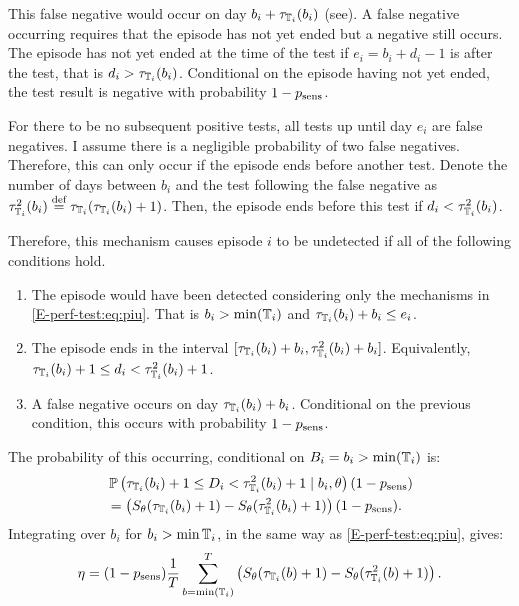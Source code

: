 \documentclass[thesis.tex]{subfiles}
\begin{document}
This false negative would occur on day $b_i + \tau_{\mathbb{T}_i}(b_i)$ (see).
A false negative occurring requires that the episode has not yet ended but a negative still occurs.
The episode has not yet ended at the time of the test if $e_i = b_i + d_i - 1$ is after the test, that is $d_i > \tau_{\mathbb{T}_i}(b_i)$.
Conditional on the episode having not yet ended, the test result is negative with probability $1 - p_\text{sens}$.

For there to be no subsequent positive tests, all tests up until day $e_i$ are false negatives.
I assume there is a negligible probability of two false negatives.
Therefore, this can only occur if the episode ends before another test.
Denote the number of days between $b_i$ and the test following the false negative as $\tau^2_{\mathbb{T}_i}(b_i) \stackrel{\text{def}}{=} \tau_{\mathbb{T}_i}(\tau_{\mathbb{T}_i}(b_i) + 1)$.
Then, the episode ends before this test if $d_i < \tau^2_{\mathbb{T}_i}(b_i)$.

Therefore, this mechanism causes episode $i$ to be undetected if all of the following conditions hold.
\begin{enumerate}
    \item The episode would have been detected considering only the mechanisms in \cref{E-perf-test:eq:piu}. That is $b_i > \min(\mathbb{T}_i)$ and $\tau_{\mathbb{T}_i}(b_i) + b_i \leq e_i$.
    \item The episode ends in the interval $[\tau_{\mathbb{T}_i}(b_i) + b_i, \tau^2_{\mathbb{T}_i}(b_i) + b_i]$. Equivalently, $\tau_{\mathbb{T}_i}(b_i) + 1 \leq d_i < \tau^2_{\mathbb{T}_i}(b_i) + 1$.
    \item A false negative occurs on day $\tau_{\mathbb{T}_i}(b_i) + b_i$. Conditional on the previous condition, this occurs with probability $1 - p_\text{sens}$.
\end{enumerate}

The probability of this occurring, conditional on $B_i = b_i > \min(\mathbb{T}_i)$ is:
\begin{align}
&\operatorname{\mathbb{P}} \left(
    \tau_{\mathbb{T}_i}(b_i) + 1 \leq D_i < \tau^2_{\mathbb{T}_i}(b_i) + 1
    \mid b_i,
\theta \right) (1 - p_\text{sens}) \\
&= \left( S_\theta(\tau_{\mathbb{T}_i}(b_i) + 1) - S_\theta(\tau^2_{\mathbb{T}_i}(b_i) + 1) \right) (1 - p_\text{sens}).
\end{align}
Integrating over $b_i$ for $b_i > \min \mathbb{T}_i$, in the same way as \cref{E-perf-test:eq:piu}, gives:
\begin{align}
\eta = (1 - p_\text{sens})\frac{1}{T} \sum_{b=\min(\mathbb{T}_i)}^T \left( S_\theta(\tau_{\mathbb{T}_i}(b) + 1) - S_\theta(\tau^2_{\mathbb{T}_i}(b) + 1) \right).
\end{align}
\end{document}
